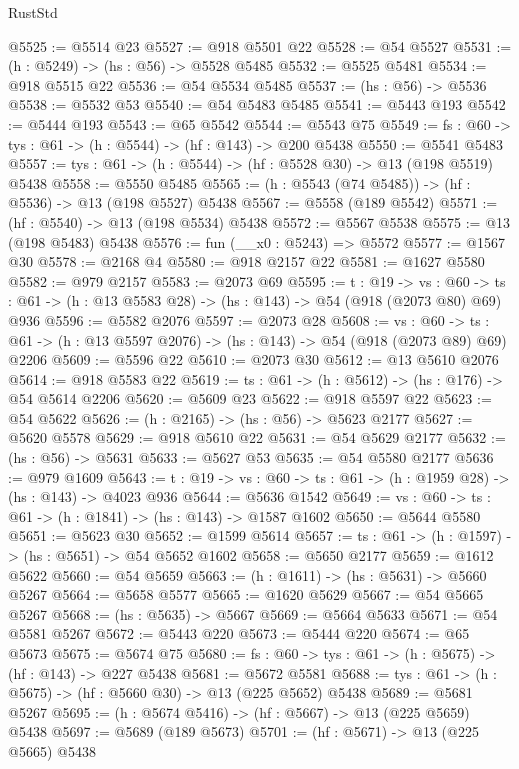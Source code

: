 \begin{lexlean}{RustStd}
\begin{coremodule}
@5525 := @5514 @23
@5527 := @918 @5501 @22
@5528 := @54 @5527
@5531 := (h : @5249) -> (hs : @56) -> @5528 @5485
@5532 := @5525 @5481
@5534 := @918 @5515 @22
@5536 := @54 @5534 @5485
@5537 := (hs : @56) -> @5536
@5538 := @5532 @53
@5540 := @54 @5483 @5485
@5541 := @5443 @193
@5542 := @5444 @193
@5543 := @65 @5542
@5544 := @5543 @75
@5549 := {fs : @60} -> {tys : @61} -> (h : @5544) -> (hf : @143) -> @200 @5438
@5550 := @5541 @5483
@5557 := {tys : @61} -> (h : @5544) -> (hf : @5528 @30) -> @13 (@198 @5519) @5438
@5558 := @5550 @5485
@5565 := (h : @5543 (@74 @5485)) -> (hf : @5536) -> @13 (@198 @5527) @5438
@5567 := @5558 (@189 @5542)
@5571 := (hf : @5540) -> @13 (@198 @5534) @5438
@5572 := @5567 @5538
@5575 := @13 (@198 @5483) @5438
@5576 := fun (__x0 : @5243) => @5572
@5577 := @1567 @30
@5578 := @2168 @4
@5580 := @918 @2157 @22
@5581 := @1627 @5580
@5582 := @979 @2157
@5583 := @2073 @69
@5595 := {t : @19} ->
  {vs : @60} -> {ts : @61} -> (h : @13 @5583 @28) -> (hs : @143) -> @54 (@918 (@2073 @80) @69) @936
@5596 := @5582 @2076
@5597 := @2073 @28
@5608 := {vs : @60} ->
  {ts : @61} -> (h : @13 @5597 @2076) -> (hs : @143) -> @54 (@918 (@2073 @89) @69) @2206
@5609 := @5596 @22
@5610 := @2073 @30
@5612 := @13 @5610 @2076
@5614 := @918 @5583 @22
@5619 := {ts : @61} -> (h : @5612) -> (hs : @176) -> @54 @5614 @2206
@5620 := @5609 @23
@5622 := @918 @5597 @22
@5623 := @54 @5622
@5626 := (h : @2165) -> (hs : @56) -> @5623 @2177
@5627 := @5620 @5578
@5629 := @918 @5610 @22
@5631 := @54 @5629 @2177
@5632 := (hs : @56) -> @5631
@5633 := @5627 @53
@5635 := @54 @5580 @2177
@5636 := @979 @1609
@5643 := {t : @19} -> {vs : @60} -> {ts : @61} -> (h : @1959 @28) -> (hs : @143) -> @4023 @936
@5644 := @5636 @1542
@5649 := {vs : @60} -> {ts : @61} -> (h : @1841) -> (hs : @143) -> @1587 @1602
@5650 := @5644 @5580
@5651 := @5623 @30
@5652 := @1599 @5614
@5657 := {ts : @61} -> (h : @1597) -> (hs : @5651) -> @54 @5652 @1602
@5658 := @5650 @2177
@5659 := @1612 @5622
@5660 := @54 @5659
@5663 := (h : @1611) -> (hs : @5631) -> @5660 @5267
@5664 := @5658 @5577
@5665 := @1620 @5629
@5667 := @54 @5665 @5267
@5668 := (hs : @5635) -> @5667
@5669 := @5664 @5633
@5671 := @54 @5581 @5267
@5672 := @5443 @220
@5673 := @5444 @220
@5674 := @65 @5673
@5675 := @5674 @75
@5680 := {fs : @60} -> {tys : @61} -> (h : @5675) -> (hf : @143) -> @227 @5438
@5681 := @5672 @5581
@5688 := {tys : @61} -> (h : @5675) -> (hf : @5660 @30) -> @13 (@225 @5652) @5438
@5689 := @5681 @5267
@5695 := (h : @5674 @5416) -> (hf : @5667) -> @13 (@225 @5659) @5438
@5697 := @5689 (@189 @5673)
@5701 := (hf : @5671) -> @13 (@225 @5665) @5438

\end{coremodule}
\end{lexlean}
